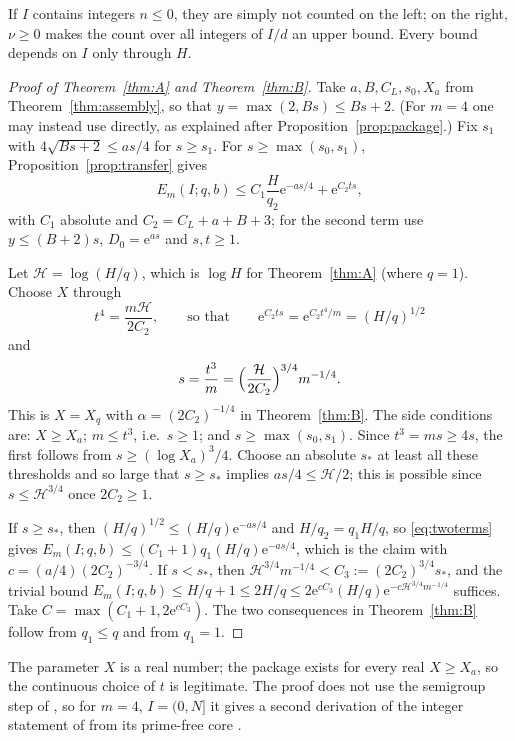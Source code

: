 \documentclass[10pt,reqno]{amsart}
\theoremstyle{definition}
\newcommand{\e}{\mathrm e}
\begin{document}
If $I$ contains integers $n\leq0$, they are simply not counted on the
left; on the right, $\nu\geq0$ makes the count over all integers of
$I/d$ an upper bound.  Every bound depends on $I$ only through $H$.

\begin{proof}[Proof of Theorem~\ref{thm:A} and Theorem~\ref{thm:B}]
Take $a,B,C_L,s_0,X_a$ from Theorem~\ref{thm:assembly}, so that
$y=\max(2,Bs)\leq Bs+2$.  (For $m=4$ one may instead use \cite{TQ}
directly, as explained after Proposition~\ref{prop:package}.)
Fix $s_1$ with $4\sqrt{Bs+2}\leq as/4$ for $s\geq s_1$.  For
$s\geq\max(s_0,s_1)$, Proposition~\ref{prop:transfer} gives
\begin{equation}\label{eq:twoterms}
 E_m(I;q,b)\leq C_1\frac H{q_2}\e^{-as/4}+\e^{C_2ts},
\end{equation}
with $C_1$ absolute and $C_2=C_L+a+B+3$; for the second term use
$y\leq(B+2)s$, $D_0=\e^{as}$ and $s,t\geq1$.

Let $\mathcal H=\log(H/q)$, which is $\log H$ for Theorem~\ref{thm:A}
(where $q=1$).  Choose $X$ through
\[
 t^4=\frac{m\mathcal H}{2C_2},\qquad\text{so that}\qquad
 \e^{C_2ts}=\e^{C_2t^4/m}=(H/q)^{1/2}
\]
and
\[
 s=\frac{t^3}m=\Bigl(\frac{\mathcal H}{2C_2}\Bigr)^{3/4}m^{-1/4}.
\]
This is $X=X_q$ with $\alpha=(2C_2)^{-1/4}$ in Theorem~\ref{thm:B}.  The
side conditions are: $X\geq X_a$; $m\leq t^3$, i.e.\ $s\geq1$; and
$s\geq\max(s_0,s_1)$.  Since $t^3=ms\geq4s$, the first follows from
$s\geq(\log X_a)^3/4$.  Choose an absolute $s_*$ at least all these
thresholds and so large that $s\geq s_*$ implies $as/4\leq\mathcal H/2$;
this is possible since $s\leq\mathcal H^{3/4}$ once $2C_2\geq1$.

If $s\geq s_*$, then $(H/q)^{1/2}\leq(H/q)\e^{-as/4}$ and $H/q_2=q_1H/q$,
so \eqref{eq:twoterms} gives
$E_m(I;q,b)\leq(C_1+1)q_1(H/q)\e^{-as/4}$, which is the claim with
$c=(a/4)(2C_2)^{-3/4}$.  If $s<s_*$, then
$\mathcal H^{3/4}m^{-1/4}<C_3:=(2C_2)^{3/4}s_*$, and the trivial bound
$E_m(I;q,b)\leq H/q+1\leq2H/q\leq2\e^{cC_3}(H/q)\e^{-c\mathcal H^{3/4}m^{-1/4}}$
suffices.  Take $C=\max(C_1+1,2\e^{cC_3})$.  The two consequences in
Theorem~\ref{thm:B} follow from $q_1\leq q$ and from $q_1=1$.
\end{proof}

The parameter $X$ is a real number; the package exists for every real
$X\geq X_a$, so the continuous choice of $t$ is legitimate.  The proof
does not use the semigroup step of \cite[\S9]{TQ}, so for $m=4$,
$I=(0,N]$ it gives a second derivation of the integer statement of
\cite[Theorem~1.1]{TQ} from its prime-free core
\cite[Theorem~8.2]{TQ}.
\end{document}
